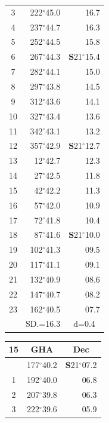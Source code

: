 \documentclass[10pt, a4paper]{report}
\begin{document}
\begin{scriptsize}
\begin{tabular*}{0.2\textwidth}[t]{@{\extracolsep{\fill}}|c|rr|}
3 & 222$^\circ$45.0 & \raisebox{0.24ex}{\boldmath$\cdot$~\boldmath$\cdot$~~}16.7\\
4 & 237$^\circ$44.7 & 16.3\\
5 & 252$^\circ$44.5 & 15.8\\[2Pt]
6 & 267$^\circ$44.3 & \textbf{S}21$^\circ$15.4\\
7 & 282$^\circ$44.1 & 15.0\\
8 & 297$^\circ$43.8 & 14.5\\
9 & 312$^\circ$43.6 & \raisebox{0.24ex}{\boldmath$\cdot$~\boldmath$\cdot$~~}14.1\\
10 & 327$^\circ$43.4 & 13.6\\
11 & 342$^\circ$43.1 & 13.2\\[2Pt]
12 & 357$^\circ$42.9 & \textbf{S}21$^\circ$12.7\\
13 & 12$^\circ$42.7 & 12.3\\
14 & 27$^\circ$42.5 & 11.8\\
15 & 42$^\circ$42.2 & \raisebox{0.24ex}{\boldmath$\cdot$~\boldmath$\cdot$~~}11.3\\
16 & 57$^\circ$42.0 & 10.9\\
17 & 72$^\circ$41.8 & 10.4\\[2Pt]
18 & 87$^\circ$41.6 & \textbf{S}21$^\circ$10.0\\
19 & 102$^\circ$41.3 & 09.5\\
20 & 117$^\circ$41.1 & 09.1\\
21 & 132$^\circ$40.9 & \raisebox{0.24ex}{\boldmath$\cdot$~\boldmath$\cdot$~~}08.6\\
22 & 147$^\circ$40.7 & 08.2\\
23 & 162$^\circ$40.5 & 07.7\\
\hline
\rule{0pt}{2.4ex} & \multicolumn{1}{c}{SD.=16.3} & \multicolumn{1}{c|}{d=0.4}\\
\hline
\end{tabular*}\noindent
\begin{tabular*}{0.2\textwidth}[t]{@{\extracolsep{\fill}}|c|rr|}
\hline
\multicolumn{1}{|c|}{\rule{0pt}{2.6ex}\textbf{15}} & \multicolumn{1}{c}{\textbf{GHA}} & \multicolumn{1}{c|}{\textbf{Dec}}\\
\hline\rule{0pt}{2.6ex}\noindent
0 & 177$^\circ$40.2 & \textbf{S}21$^\circ$07.2\\
1 & 192$^\circ$40.0 & 06.8\\
2 & 207$^\circ$39.8 & 06.3\\
3 & 222$^\circ$39.6 & \raisebox{0.24ex}{\boldmath$\cdot$~\boldmath$\cdot$~~}05.9\\

\end{tabular*}
\end{scriptsize}
\end{document}
